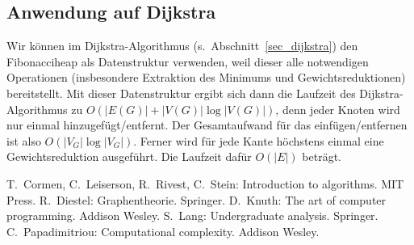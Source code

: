 \documentclass[10pt,reqno]{amsart}
\numberwithin{equation}{section}
\begin{document}
			\subsection{Anwendung auf Dijkstra}\label{sec_fibo_dijkstra}
			Wir k\"onnen im Dijkstra-Algorithmus (s.\ Abschnitt~\ref{sec_dijkstra}) den Fibonacciheap als Datenstruktur verwenden, weil dieser alle notwendigen Operationen (insbesondere Extraktion des Minimums und Gewichtsreduktionen) bereitstellt.
			Mit dieser Datenstruktur ergibt sich dann die Laufzeit des Dijkstra-Algorithmus zu $O(|E(G)|+|V(G)|\log|V(G)|)$, denn jeder Knoten wird nur einmal hinzugef\"ugt/entfernt.
	Der			Gesamtaufwand f\"ur das einf\"ugen/entfernen ist also $O(|V_G|\log|V_G|)$.
				Ferner wird f\"ur jede Kante h\"ochstens einmal eine Gewichtsreduktion ausgef\"uhrt.
				Die Laufzeit daf\"ur $O(|E|)$ betr\"agt.


\begin{thebibliography}{99}
	T.~Cormen, C.~Leiserson, R.~Rivest, C.~Stein: Introduction to algorithms. MIT Press.
	R.~Diestel: Graphentheorie. Springer.
	D.~Knuth: The art of computer programming. Addison Wesley.
	S.~Lang: Undergraduate analysis. Springer.
	C.~Papadimitriou: Computational complexity. Addison Wesley.
\end{thebibliography}
\end{document}
